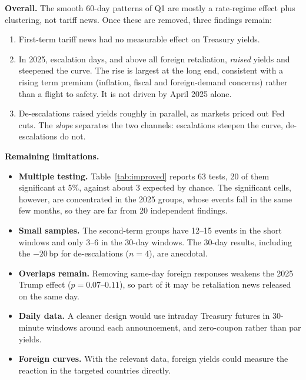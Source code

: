 \documentclass[11pt]{article}
\begin{document}
\textbf{Overall.} The smooth 60-day patterns of Q1 are mostly a rate-regime
effect plus clustering, not tariff news. Once these are removed, three
findings remain:
\begin{enumerate}[nosep]
\item First-term tariff news had no measurable effect on Treasury yields.
\item In 2025, escalation days, and above all foreign retaliation,
\emph{raised} yields and steepened the curve. The rise is largest at the long
end, consistent with a rising term premium (inflation, fiscal and
foreign-demand concerns) rather than a flight to safety. It is not driven by
April 2025 alone.
\item De-escalations raised yields roughly in parallel, as markets priced out
Fed cuts. The \emph{slope} separates the two channels: escalations steepen
the curve, de-escalations do not.
\end{enumerate}

\textbf{Remaining limitations.}
\begin{itemize}[nosep]
\item \textbf{Multiple testing.} Table~\ref{tab:improved} reports 63 tests,
20 of them significant at 5\%, against about 3 expected by chance. The
significant cells, however, are concentrated in the 2025 groups, whose events
fall in the same few months, so they are far from 20 independent findings.
\item \textbf{Small samples.} The second-term groups have 12--15 events in
the short windows and only 3--6 in the 30-day windows. The 30-day results,
including the $-20$\,bp for de-escalations ($n=4$), are anecdotal.
\item \textbf{Overlaps remain.} Removing same-day foreign responses weakens
the 2025 Trump effect ($p=0.07$--$0.11$), so part of it may be retaliation
news released on the same day.
\item \textbf{Daily data.} A cleaner design would use intraday Treasury
futures in 30-minute windows around each announcement, and zero-coupon rather
than par yields.
\item \textbf{Foreign curves.} With the relevant data, foreign yields could
measure the reaction in the targeted countries directly.
\end{itemize}

\end{document}
